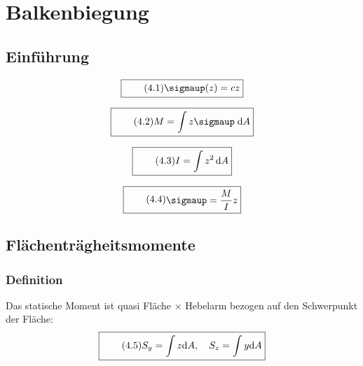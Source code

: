 \documentclass[11pt]{article}
\newcommand{\1}{ {\mathds{1}} }
\newcommand{\td}{\,\text{d}}
\renewcommand{\sigma  }{\sigmaup   }
\begin{document}
		\section{Balkenbiegung}
		\subsection{Einführung}

		\begin{equation}
			\boxed{
				\tag{4.1}
				\begin{split}
					\sigma(z) = c z
				\end{split}
			}
		\end{equation}

		\begin{equation}
			\boxed{
				\tag{4.2}
				\begin{split}
					M = \int{z\sigma \; \text{d}A}
				\end{split}
			}
		\end{equation}

				\begin{equation}
			\boxed{
				\tag{4.3}
				\begin{split}
					I = \int z^2 \td A
				\end{split}
			}
		\end{equation}

						\begin{equation}
			\boxed{
				\tag{4.4}
				\begin{split}
					\sigma = \frac{M}{I} z
				\end{split}
			}
		\end{equation}

		\subsection{Flächenträgheitsmomente}
		\subsubsection{Definition}

		Das statische Moment ist quasi Fläche $\times$ Hebelarm bezogen auf den Schwerpunkt der Fläche:
		\begin{equation}
			\boxed{
				\tag{4.5}
				\begin{split}
					S_y
					=
					\int z \text{d} A, \quad
					S_z
					=
					\int y \text{d} A
				\end{split}
			}
		\end{equation}
\end{document}

